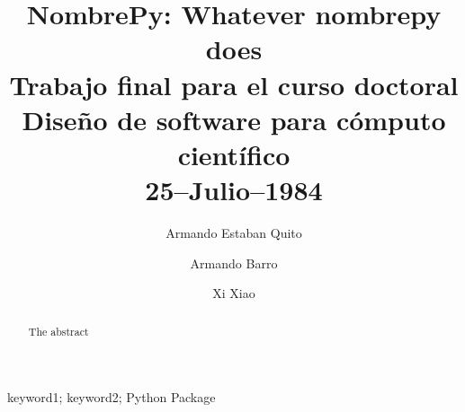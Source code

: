 \documentclass[final,5p,times,twocolumn]{elsarticle}
\begin{document}
\begin{frontmatter}


\title{
    NombrePy: Whatever nombrepy does \\
    \normalsize{
        Trabajo final para el curso doctoral 
        Diseño de software para cómputo científico \\ 25--Julio--1984} 
    }






\author[iate,oac,famaf]{Armando Estaban Quito}%
\author[utn]{Armando Barro}
\author[iate,oac]{Xi Xiao}

\address[iate]{
   Instituto de Astronom\'ia Te\'orica y Experimental -
   Observatorio Astron\'omico de C\'ordoba (IATE, UNC--CONICET),
   C\'ordoba, Argentina.}
\address[oac]{
    Observatorio Astron\'{o}mico de C\'{o}rdoba, Universidad Nacional de C\'{o}rdoba, Laprida 854, X5000BGR, C\'{o}rdoba, Argentina
}
\address[famaf]{
	Facultad de Matem\'atica, Astronom\'{\i}a y F\'{\i}sica,
    Universidad Nacional de C\'ordoba (FaMAF--UNC)
	Bvd. Medina Allende s/n, Ciudad Universitaria,
    X5000HUA, C\'ordoba, Argentina 
}
\address[utn]{
    Universidad Tecnol\'ogica Nacional, Facultad Regional C\'ordoba (UTN--FRC), Maestro M. Lopez esq. Cruz Roja Argentina, Ciudad Universitaria - C\'ordoba Capital
}


\begin{abstract}

The abstract

\end{abstract}

\begin{keyword}
keyword1; keyword2; Python Package


\end{keyword}
\end{frontmatter}
\end{document}
